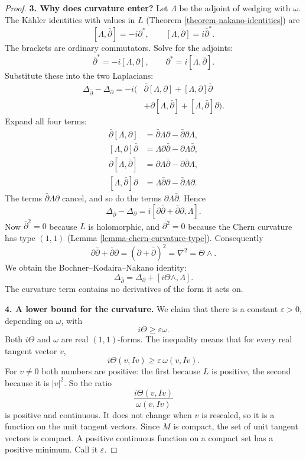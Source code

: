 \begin{proof}
\medskip\noindent
{\bf 3. Why does curvature enter?}
Let $\Lambda$ be the adjoint of wedging
with $\omega$.
The Kähler identities with values in
$L$ (Theorem
\ref{theorem-nakano-identities}) are
$$
[\Lambda,\bar\partial]=-i\partial^*,
\qquad
[\Lambda,\partial]=i\bar\partial^*.
$$
The brackets are ordinary commutators.
Solve for the adjoints:
$$
\bar\partial^*=-i[\Lambda,\partial],
\qquad
\partial^*=i[\Lambda,\bar\partial].
$$
Substitute these into the two
Laplacians:
$$
\begin{aligned}
\Delta_{\bar\partial}-\Delta_{\partial}
=-i\bigl(
&\bar\partial[\Lambda,\partial]
+[\Lambda,\partial]\bar\partial\\
&+\partial[\Lambda,\bar\partial]
+[\Lambda,\bar\partial]\partial
\bigr).
\end{aligned}
$$
Expand all four terms:
$$
\begin{aligned}
\bar\partial[\Lambda,\partial]
&=\bar\partial\Lambda\partial
-\bar\partial\partial\Lambda,\\
[\Lambda,\partial]\bar\partial
&=\Lambda\partial\bar\partial
-\partial\Lambda\bar\partial,\\
\partial[\Lambda,\bar\partial]
&=\partial\Lambda\bar\partial
-\partial\bar\partial\Lambda,\\
[\Lambda,\bar\partial]\partial
&=\Lambda\bar\partial\partial
-\bar\partial\Lambda\partial.
\end{aligned}
$$
The terms
$\bar\partial\Lambda\partial$ cancel, and
so do the terms
$\partial\Lambda\bar\partial$. Hence
$$
\Delta_{\bar\partial}-\Delta_{\partial}
=i[\partial\bar\partial
+\bar\partial\partial,\Lambda].
$$
Now $\bar\partial^2=0$ because $L$ is
holomorphic, and $\partial^2=0$ because
the Chern curvature has type $(1,1)$
(Lemma \ref{lemma-chern-curvature-type}).
Consequently
$$
\partial\bar\partial
+\bar\partial\partial
=(\partial+\bar\partial)^2
=\nabla^2=\Theta\wedge.
$$
We obtain the Bochner--Kodaira--Nakano
identity:
$$
\Delta_{\bar\partial}
=\Delta_{\partial}
+[i\Theta\wedge,\Lambda].
$$
The curvature term contains no
derivatives of the form it acts on.

\medskip\noindent
{\bf 4. A lower bound for the curvature.}
We claim that there is a constant
$\varepsilon>0$, depending on $\omega$,
with
$$
i\Theta\geq\varepsilon\omega.
$$
Both $i\Theta$ and $\omega$ are real
$(1,1)$-forms. The inequality means
that for every real tangent vector $v$,
$$
i\Theta(v,Iv)
\geq\varepsilon\,\omega(v,Iv).
$$
For $v\neq0$ both numbers are positive:
the first because $L$ is positive, the
second because it is $|v|^2$.
So the ratio
$$
\frac{i\Theta(v,Iv)}{\omega(v,Iv)}
$$
is positive and continuous. It does not
change when $v$ is rescaled, so it is a
function on the unit tangent vectors.
Since $M$ is compact, the set of unit
tangent vectors is compact. A positive
continuous function on a compact set
has a positive minimum. Call it
$\varepsilon$.


\end{proof}
